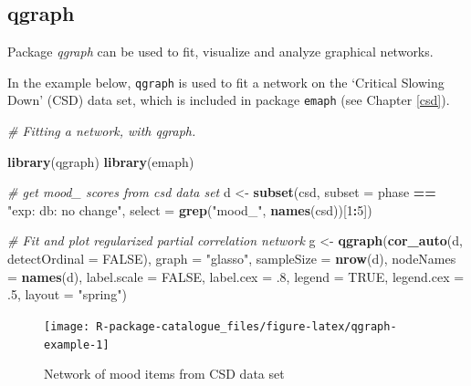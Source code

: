 \documentclass[]{book}
\newenvironment{Shaded}{\begin{snugshade}}{\end{snugshade}}
\newcommand{\KeywordTok}[1]{\textcolor[rgb]{0.13,0.29,0.53}{\textbf{#1}}}
\newcommand{\DataTypeTok}[1]{\textcolor[rgb]{0.13,0.29,0.53}{#1}}
\newcommand{\DecValTok}[1]{\textcolor[rgb]{0.00,0.00,0.81}{#1}}
\newcommand{\StringTok}[1]{\textcolor[rgb]{0.31,0.60,0.02}{#1}}
\newcommand{\CommentTok}[1]{\textcolor[rgb]{0.56,0.35,0.01}{\textit{#1}}}
\newcommand{\OtherTok}[1]{\textcolor[rgb]{0.56,0.35,0.01}{#1}}
\newcommand{\OperatorTok}[1]{\textcolor[rgb]{0.81,0.36,0.00}{\textbf{#1}}}
\newcommand{\NormalTok}[1]{#1}
\begin{document}
\subsection{qgraph}\label{qgraph}


Package \emph{qgraph} \citep{Epskamp2012} can be used to fit, visualize
and analyze graphical networks.

In the example below, \texttt{qgraph} is used to fit a network on the
`Critical Slowing Down' (CSD) data set, which is included in package
\texttt{emaph} (see Chapter \ref{csd}).

\begin{Shaded}
\begin{Highlighting}[]
\CommentTok{# Fitting a network, with qgraph.}

\KeywordTok{library}\NormalTok{(qgraph)}
\KeywordTok{library}\NormalTok{(emaph)}

\CommentTok{# get mood_ scores from csd data set}
\NormalTok{d <-}\StringTok{ }\KeywordTok{subset}\NormalTok{(csd, }
            \DataTypeTok{subset =}\NormalTok{ phase }\OperatorTok{==}\StringTok{ "exp: db: no change"}\NormalTok{, }
            \DataTypeTok{select =} \KeywordTok{grep}\NormalTok{(}\StringTok{"mood_"}\NormalTok{, }\KeywordTok{names}\NormalTok{(csd))[}\DecValTok{1}\OperatorTok{:}\DecValTok{5}\NormalTok{])}


\CommentTok{# Fit and plot regularized partial correlation network}
\NormalTok{g <-}\StringTok{ }\KeywordTok{qgraph}\NormalTok{(}\KeywordTok{cor_auto}\NormalTok{(d, }\DataTypeTok{detectOrdinal =} \OtherTok{FALSE}\NormalTok{),}
       \DataTypeTok{graph =} \StringTok{"glasso"}\NormalTok{, }\DataTypeTok{sampleSize =} \KeywordTok{nrow}\NormalTok{(d),}
       \DataTypeTok{nodeNames =} \KeywordTok{names}\NormalTok{(d),}
       \DataTypeTok{label.scale =} \OtherTok{FALSE}\NormalTok{, }\DataTypeTok{label.cex =}\NormalTok{ .}\DecValTok{8}\NormalTok{, }
       \DataTypeTok{legend =} \OtherTok{TRUE}\NormalTok{, }\DataTypeTok{legend.cex =}\NormalTok{ .}\DecValTok{5}\NormalTok{,}
       \DataTypeTok{layout =} \StringTok{"spring"}\NormalTok{)}
\end{Highlighting}
\end{Shaded}

\begin{figure}

{\centering \texttt{[image: R-package-catalogue\_files/figure-latex/qgraph-example-1]} 

}

\caption{Network of mood items from CSD data set}\label{fig:qgraph-example}
\end{figure}
\end{document}
